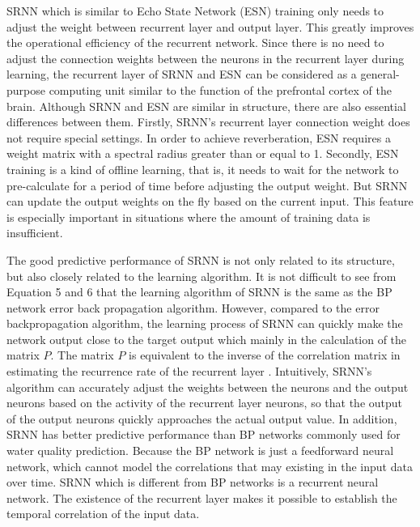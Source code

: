 \documentclass[runningheads]{llncs}
\begin{document}
SRNN which is similar to Echo State Network (ESN) training only needs 
to adjust the weight between recurrent layer and output layer. 
This greatly improves the operational efficiency of the recurrent network. 
Since there is no need to adjust the connection weights between the neurons 
in the recurrent layer during learning, the recurrent layer of SRNN 
and ESN can be considered as a general-purpose computing unit similar
to the function of the prefrontal cortex of the brain\cite{RN20,RN21}. 
Although SRNN and ESN are similar in structure, there are also essential 
differences between them. Firstly, SRNN's recurrent layer connection 
weight does not require special settings. In order to achieve 
reverberation, ESN requires a weight matrix with a spectral radius 
greater than or equal to 1. Secondly, ESN training is a kind of 
offline learning, that is, it needs to wait for the network to 
pre-calculate for a period of time before adjusting the output 
weight. But SRNN can update the output weights on the fly based 
on the current input. This feature is especially important 
in situations where the amount of training data is insufficient. 

The good predictive performance of SRNN is not only related to 
its structure, but also closely related to the learning algorithm.
It is not difficult to see from Equation 5 and 6 that the 
learning algorithm of SRNN is the same as the BP network error 
back propagation algorithm. However, compared to the error 
backpropagation algorithm, the learning process of SRNN can 
quickly make the network output close to the target output 
which mainly in the calculation of the matrix $P$. The matrix $P$ 
is equivalent to the inverse of the correlation matrix in 
estimating the recurrence rate of the recurrent layer \cite{RN23}. 
Intuitively, SRNN's algorithm can accurately adjust the weights 
between the neurons and the output neurons based on the activity 
of the recurrent layer neurons, so that the output of the 
output neurons quickly approaches the actual output value. 
In addition, SRNN has better predictive performance than BP 
networks commonly used for water quality prediction. Because 
the BP network is just a feedforward neural network, which 
cannot model the correlations that may existing in the input data 
over time. SRNN which is different from BP networks is a recurrent neural 
network. The existence of the recurrent layer makes it possible 
to establish the temporal correlation of the input data. 
\end{document}
